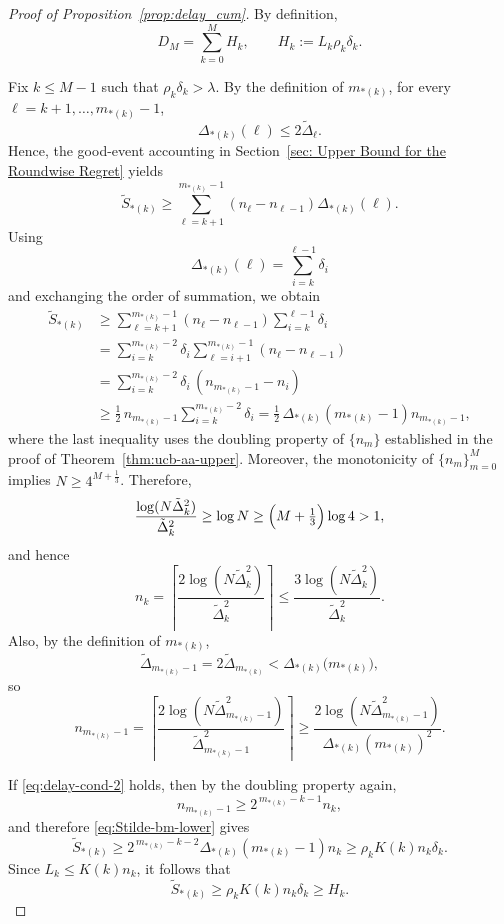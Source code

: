 \documentclass[
  12pt]{article}
\begin{document}
\begin{proof}[Proof of Proposition~\ref{prop:delay_cum}]
By definition,
\begin{equation}\label{eq:delayDm-upper}
D_M
=
\sum_{k=0}^{M}H_k,
\qquad
H_k:=L_k\rho_k\delta_k .
\end{equation}

Fix $k\le M-1$ such that $\rho_k\delta_k>\lambda$. By the definition of $m_{*(k)}$, for every
$\ell=k+1,\dots,m_{*(k)}-1$,
\[
\Delta_{*(k)}(\ell)\le 2\tilde{\Delta}_\ell.
\]
Hence, the good-event accounting in Section~\ref{sec: Upper Bound for the Roundwise Regret} yields
\[
\tilde S_{*(k)}
\ge
\sum_{\ell=k+1}^{m_{*(k)}-1}(n_\ell-n_{\ell-1})\Delta_{*(k)}(\ell).
\]
Using
\[
\Delta_{*(k)}(\ell)=\sum_{i=k}^{\ell-1}\delta_i
\]
and exchanging the order of summation, we obtain
\begin{align}
\tilde S_{*(k)}
&\ge
\sum_{\ell=k+1}^{m_{*(k)}-1}(n_\ell-n_{\ell-1})
\sum_{i=k}^{\ell-1}\delta_i \nonumber\\
&=
\sum_{i=k}^{m_{*(k)}-2}\delta_i
\sum_{\ell=i+1}^{m_{*(k)}-1}(n_\ell-n_{\ell-1}) \nonumber\\
&=
\sum_{i=k}^{m_{*(k)}-2}\delta_i\,(n_{m_{*(k)}-1}-n_i) \nonumber\\
&\ge
\frac12\,n_{m_{*(k)}-1}\sum_{i=k}^{m_{*(k)}-2}\delta_i
=
\frac12\,\Delta_{*(k)}(m_{*(k)}-1)n_{m_{*(k)}-1},
\label{eq:Stilde-bm-lower}
\end{align}
where the last inequality uses the doubling property of $\{n_m\}$ established in the proof of
Theorem~\ref{thm:ucb-aa-upper}. Moreover, the monotonicity of $\{n_m\}_{m=0}^M$ implies $N\ge 4^{M+\frac13}$. Therefore,
\[
\frac{\log(N\tilde{\Delta}_k^2)}{\tilde{\Delta}_k^2}
\ge
\log N
\ge
\Bigl(M+\tfrac13\Bigr)\log 4
>1,
\]
and hence
\[
n_k
=
\left\lceil
\frac{2\log(N\tilde{\Delta}_k^2)}{\tilde{\Delta}_k^2}
\right\rceil
\le
\frac{3\log(N\tilde{\Delta}_k^2)}{\tilde{\Delta}_k^2}.
\]
Also, by the definition of $m_{*(k)}$,
\[
\tilde{\Delta}_{m_{*(k)}-1}
=
2\tilde{\Delta}_{m_{*(k)}}
<
\Delta_{*(k)}\bigl(m_{*(k)}\bigr),
\]
so
\[
n_{m_{*(k)}-1}
=
\left\lceil
\frac{2\log(N\tilde{\Delta}_{m_{*(k)}-1}^2)}
{\tilde{\Delta}_{m_{*(k)}-1}^2}
\right\rceil
\ge
\frac{2\log(N\tilde{\Delta}_{m_{*(k)}-1}^2)}
{\Delta_{*(k)}(m_{*(k)})^2}.
\]

If \eqref{eq:delay-cond-2} holds, then by the doubling property again,
\[
n_{m_{*(k)}-1}\ge 2^{\,m_{*(k)}-k-1}n_k,
\]
and therefore \eqref{eq:Stilde-bm-lower} gives
\[
\tilde S_{*(k)}
\ge
2^{\,m_{*(k)}-k-2}\Delta_{*(k)}(m_{*(k)}-1)n_k
\ge
\rho_k K(k)n_k\delta_k.
\]
Since $L_k\le K(k)n_k$, it follows that
\[
\tilde S_{*(k)}\ge \rho_k K(k)n_k\delta_k\ge H_k.
\]


\end{proof}
\end{document}
